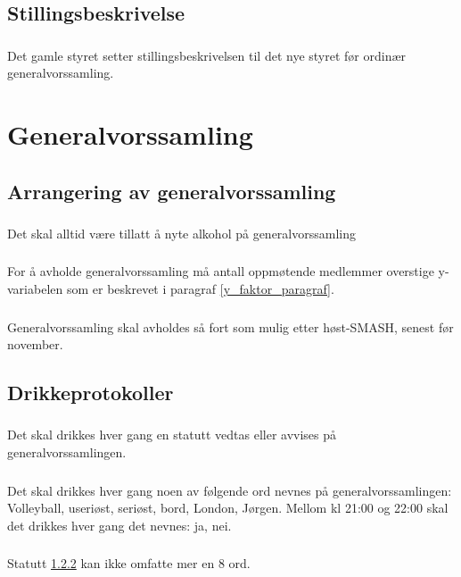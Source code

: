 \documentclass{article}
\newenvironment{statute}[1][]
    {
        \titleformat{\subsubsection}[runin]{\normalfont}{\hspace{1pt}\textit{\S\hspace{5pt}\thesubsubsection}}{0pt}{\rule{4pt}{0pt}}{}
        \subsubsection{}#1
        \begin{minipage}[t]{0.9\linewidth}
    }
    {
        \end{minipage}
        
        \ignorespacesafterend
    }
\begin{document}
        \subsection{Stillingsbeskrivelse}
            \begin{statute}
                Det gamle styret setter stillingsbeskrivelsen til det nye styret før ordinær generalvorssamling.
            \end{statute}
            
    \section{Generalvorssamling}
        \subsection{Arrangering av generalvorssamling}
            \begin{statute}
                Det skal alltid være tillatt å nyte alkohol på generalvorssamling
            \end{statute}
            \begin{statute} 
                For å avholde generalvorssamling må antall oppmøtende medlemmer overstige y-variabelen som er beskrevet i paragraf \ref{y_faktor_paragraf}.
            \end{statute}
            \begin{statute}
                Generalvorssamling skal avholdes så fort som mulig etter høst-SMASH, senest før november.
            \end{statute}
            
        \subsection{Drikkeprotokoller}
            \begin{statute}
                Det skal drikkes hver gang en statutt vedtas eller avvises på generalvorssamlingen.
            \end{statute}
            \begin{statute}[\label{drikkeprotokoll_forbudte_ord}]
                Det skal drikkes hver gang noen av følgende ord nevnes på generalvorssamlingen: Volleyball, useriøst, seriøst, bord, London, Jørgen. Mellom kl 21:00 og 22:00 skal det drikkes hver gang det nevnes: ja, nei.
            \end{statute}
        	\begin{statute}
        		Statutt \ref{drikkeprotokoll_forbudte_ord} kan ikke omfatte mer en 8 ord.
        	\end{statute}
            
\end{document}
